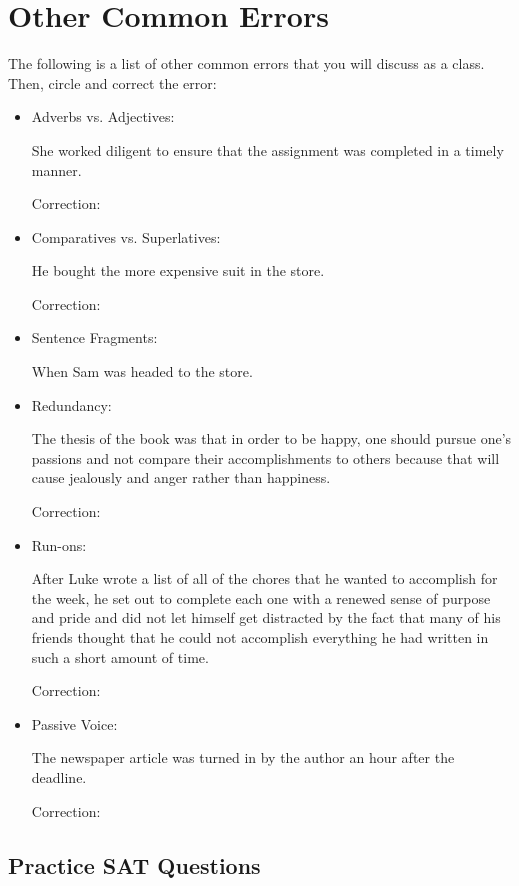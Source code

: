 \section{Other Common Errors}

The following is a list of other common errors that you will discuss as a class. Then, circle and correct the error:
\begin{itemize}
 \item{Adverbs vs. Adjectives:} \hrulefill

 She worked diligent to ensure that the assignment was completed in a timely manner. 
 
 Correction: \hrulefill
 
\vfill\item{Comparatives vs. Superlatives:} \hrulefill

He bought the more expensive suit in the store.

Correction: \hrulefill

\vfill\item{Sentence Fragments:} \hrulefill

When Sam was headed to the store.

\vfill\item{Redundancy:} \hrulefill

The thesis of the book was that in order to be happy, one should pursue one's passions and not compare their accomplishments to others because that will cause jealously and anger rather than happiness. 

Correction: \hrulefill

\vfill\item{Run-ons:} \hrulefill

After Luke wrote a list of all of the chores that he wanted to accomplish for the week, he set out to complete each one with a renewed sense of purpose and pride and did not let himself get distracted by the fact that many of his friends thought that he could not accomplish everything he had written in such a short amount of time. 

Correction: \hrulefill 

\vfill\item{Passive Voice:} \hrulefill

The newspaper article was turned in by the author an hour after the deadline. 

Correction: \hrulefill
\end{itemize}

\vfill
\subsection{Practice SAT Questions}

